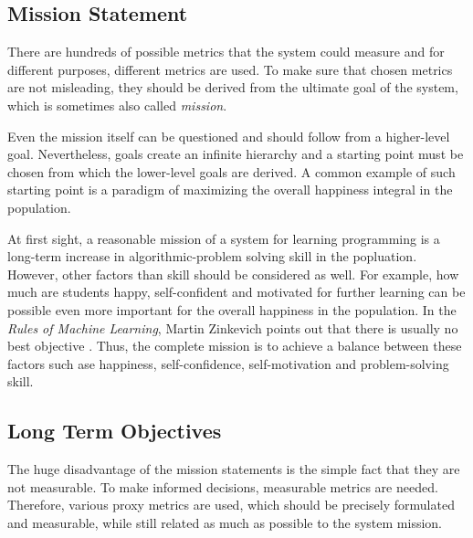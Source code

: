 \subsection{Mission Statement}
\label{sec:mission}

There are hundreds of possible metrics that the system could measure
and for different purposes, different metrics are used.
To make sure that chosen metrics are not misleading,
  they should be derived from the ultimate goal of the system,
  which is sometimes also called \emph{mission}.

Even the mission itself can be questioned
  and should follow from a higher-level goal.
Nevertheless, goals create an infinite hierarchy
  and a starting point must be chosen from which
  the lower-level goals are derived.
A common example of such starting point
  is a paradigm of maximizing the overall happiness integral in the population.

At first sight, a reasonable mission of a system for learning programming
  is a long-term increase in algorithmic-problem solving skill in the popluation.
However, other factors than skill should be considered as well.
For example, how much are students happy, self-confident and motivated for further learning
  can be possible even more important for the overall happiness in the population.
In the \emph{Rules of Machine Learning}, Martin Zinkevich
  points out that there is usually no best objective \cite[][Rule \#39]{google-ml-rules}.
Thus, the complete mission is to achieve a balance between these factors
  such ase happiness, self-confidence, self-motivation and problem-solving skill.


\subsection{Long Term Objectives}

The huge disadvantage of the mission statements
  is the simple fact that they are not measurable.
To make informed decisions, measurable metrics are needed.
Therefore, various proxy metrics are used,
  which should be precisely formulated and measurable,
  while still related as much as possible to the system mission.


